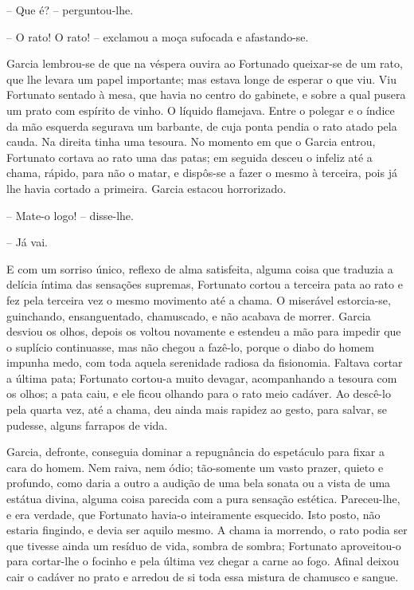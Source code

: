 -- Que é? -- perguntou-lhe.

-- O rato! O rato! -- exclamou a moça sufocada e afastando-se.

Garcia lembrou-se de que na véspera ouvira ao Fortunado queixar-se de um
rato, que lhe levara um papel importante; mas estava longe de esperar o
que viu. Viu Fortunato sentado à mesa, que havia no centro do gabinete,
e sobre a qual pusera um prato com espírito de vinho. O líquido
flamejava. Entre o polegar e o índice da mão esquerda segurava um
barbante, de cuja ponta pendia o rato atado pela cauda. Na direita tinha
uma tesoura. No momento em que o Garcia entrou, Fortunato cortava ao
rato uma das patas; em seguida desceu o infeliz até a chama, rápido,
para não o matar, e dispôs-se a fazer o mesmo à terceira, pois já lhe
havia cortado a primeira. Garcia estacou horrorizado.

-- Mate-o logo! -- disse-lhe.

-- Já vai.

E com um sorriso único, reflexo de alma satisfeita, alguma coisa que
traduzia a delícia íntima das sensações supremas, Fortunato cortou a
terceira pata ao rato e fez pela terceira vez o mesmo movimento até a
chama. O miserável estorcia-se, guinchando, ensanguentado, chamuscado, e
não acabava de morrer. Garcia desviou os olhos, depois os voltou
novamente e estendeu a mão para impedir que o suplício continuasse, mas
não chegou a fazê-lo, porque o diabo do homem impunha medo, com toda
aquela serenidade radiosa da fisionomia. Faltava cortar a última pata;
Fortunato cortou-a muito devagar, acompanhando a tesoura com os olhos; a
pata caiu, e ele ficou olhando para o rato meio cadáver. Ao descê-lo
pela quarta vez, até a chama, deu ainda mais rapidez ao gesto, para
salvar, se pudesse, alguns farrapos de vida.

Garcia, defronte, conseguia dominar a repugnância do espetáculo para
fixar a cara do homem. Nem raiva, nem ódio; tão-somente um vasto prazer,
quieto e profundo, como daria a outro a audição de uma bela sonata ou a
vista de uma estátua divina, alguma coisa parecida com a pura sensação
estética. Pareceu-lhe, e era verdade, que Fortunato havia-o inteiramente
esquecido. Isto posto, não estaria fingindo, e devia ser aquilo mesmo. A
chama ia morrendo, o rato podia ser que tivesse ainda um resíduo de
vida, sombra de sombra; Fortunato aproveitou-o para cortar-lhe o focinho
e pela última vez chegar a carne ao fogo. Afinal deixou cair o cadáver
no prato e arredou de si toda essa mistura de chamusco e sangue.

